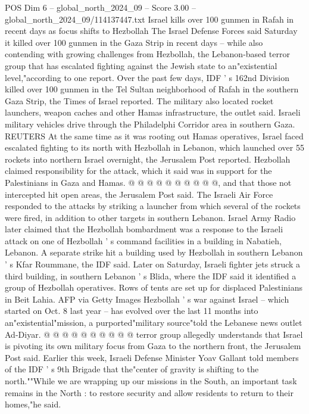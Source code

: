 \begin{textsample}{POS Dim 6 – global\_north\_2024\_09 – Score 3.00 – global\_north\_2024\_09/114137447.txt}  \label{ex:f6_pos_369}
Israel kills over 100 gunmen in Rafah in recent days as focus shifts to Hezbollah The Israel Defense Forces said Saturday it killed over 100 gunmen in the Gaza Strip in recent days -- while also contending with growing challenges from Hezbollah, the Lebanon-based terror group that has escalated fighting against the Jewish state to an"existential level,"according to one report.
Over the past few days, IDF ' s 162nd Division killed over 100 gunmen in the Tel Sultan neighborhood of Rafah in the southern Gaza Strip, the Times of Israel reported.
The military also located rocket launchers, weapon caches and other Hamas infrastructure, the outlet said.
Israeli military vehicles drive through the Philadelphi Corridor area in southern Gaza.
REUTERS At the same time as it was rooting out Hamas operatives, Israel faced escalated fighting to its north with Hezbollah in Lebanon, which launched over 55 rockets into northern Israel overnight, the Jerusalem Post reported.
Hezbollah claimed responsibility for the attack, which it said was in support for the Palestinians in Gaza and Hamas. @ @ @ @ @ @ @ @ @ @, and that those not intercepted hit open areas, the Jerusalem Post said.
The Israeli Air Force responded to the attacks by striking a launcher from which several of the rockets were fired, in addition to other targets in southern Lebanon.
Israel Army Radio later claimed that the Hezbollah bombardment was a response to the Israeli attack on one of Hezbollah ' s command facilities in a building in Nabatieh, Lebanon.
A separate strike hit a building used by Hezbollah in southern Lebanon ' s Kfar Roummane, the IDF said.
Later on Saturday, Israeli fighter jets struck a third building, in southern Lebanon ' s Blida, where the IDF said it identified a group of Hezbollah operatives.
Rows of tents are set up for displaced Palestinians in Beit Lahia.
AFP via Getty Images Hezbollah ' s war against Israel -- which started on Oct. 8 last year -- has evolved over the last 11 months into an"existential"mission, a purported"military source"told the Lebanese news outlet Ad-Diyar. @ @ @ @ @ @ @ @ @ @ terror group allegedly understands that Israel is pivoting its own military focus from Gaza to the northern front, the Jerusalem Post said.
Earlier this week, Israeli Defense Minister Yoav Gallant told members of the IDF ' s 9th Brigade that the"center of gravity is shifting to the north.""While we are wrapping up our missions in the South, an important task remains in the North : to restore security and allow residents to return to their homes,"he said.

\end{textsample}

